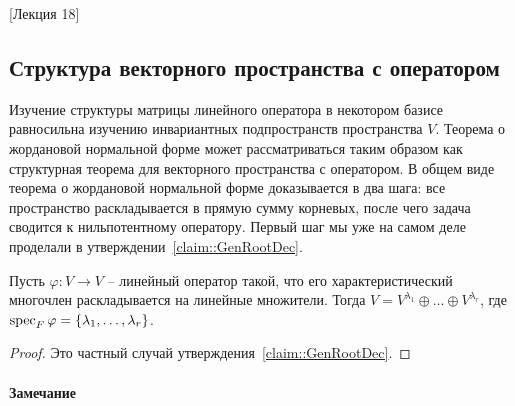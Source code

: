 [Лекция 18]

\subsection{Структура векторного пространства с оператором}

Изучение структуры матрицы линейного оператора в некотором базисе равносильна изучению инвариантных подпространств пространства $V$. Теорема о жордановой нормальной форме может рассматриваться таким образом как структурная теорема для векторного пространства с оператором. В общем виде теорема о жордановой нормальной форме доказывается в два шага: все пространство раскладывается в прямую сумму корневых, после чего задача сводится к нильпотентному оператору. Первый шаг мы уже на самом деле проделали в утверждении~\ref{claim::GenRootDec}.

\begin{claim}\label{claim::RootSpaceDec}
Пусть $\varphi\colon V\to V$ -- линейный оператор такой, что его характеристический многочлен раскладывается на линейные множители. Тогда $V = V^{\lambda_1} \oplus \ldots\oplus V^{\lambda_r}$, где $\operatorname{spec}_F \varphi = \{\lambda_1,\ldots, \lambda_r\}$.
\end{claim}
\begin{proof}
Это частный случай утверждения~\ref{claim::GenRootDec}.
\end{proof}

\paragraph{Замечание}

